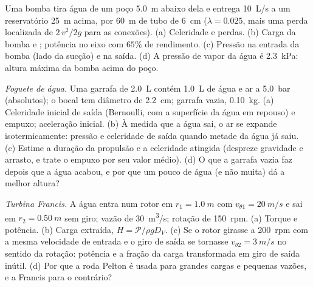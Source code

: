 \begin{exercise}[$\star\star$]\label{exo:b2:flow-balances:9}
Uma bomba tira água de um poço \qty{5.0}{m} abaixo dela e entrega
\qty{10}{L/s} a um reservatório \qty{25}{m} acima, por \qty{60}{m} de tubo de \qty{6}{cm}
($\lambda = 0.025$, mais uma perda localizada de $2\,v^2/2g$ para as conexões).
(a) Celeridade e perdas. (b) Carga da bomba e ; potência no eixo
com $65\%$ de rendimento. (c) Pressão na entrada da bomba (lado da sucção) e
na saída. (d) A pressão de vapor da água é \qty{2.3}{kPa}: altura máxima
da bomba acima do poço.
\end{exercise}

\begin{exercise}[$\star\star\star$]\label{exo:b2:flow-balances:10}
\emph{Foguete de água.} Uma garrafa de \qty{2.0}{L} contém \qty{1.0}{L} de água e
ar a \qty{5.0}{bar} (absolutos); o bocal tem diâmetro de \qty{2.2}{cm};
garrafa vazia, \qty{0.10}{kg}. (a) Celeridade inicial de saída (Bernoulli, com a superfície
da água em repouso) e empuxo; aceleração inicial. (b) À medida que a água sai,
o ar se expande isotermicamente: pressão e celeridade de saída quando metade da
água já saiu. (c) Estime a duração da propulsão e a celeridade atingida
(despreze gravidade e arrasto, e trate o empuxo por seu valor médio). (d)
O que a garrafa vazia faz depois que a água acabou, e por que
um pouco de água (e não muita) dá a melhor altura?
\end{exercise}

\begin{exercise}[$\star\star\star$]\label{exo:b2:flow-balances:11}
\emph{Turbina Francis.} A água entra num rotor em $r_1 = \qty{1.0}{m}$ com
$v_{\theta1} = \qty{20}{m/s}$ e sai em $r_2 = \qty{0.50}{m}$ sem giro;
vazão de \qty{30}{m^3/s}; rotação de \qty{150}{rpm}. (a) Torque e potência. (b)
Carga extraída, $H = \mathcal P/\rho gD_V$. (c) Se o rotor girasse a
\qty{200}{rpm} com a mesma velocidade de entrada e o giro de saída se tornasse
$v_{\theta2} = \qty{3}{m/s}$ no sentido da rotação: potência e a
fração da carga transformada em giro de saída inútil. (d) Por que a
roda Pelton é usada para grandes cargas e pequenas vazões, e a Francis para o
contrário?
\end{exercise}

